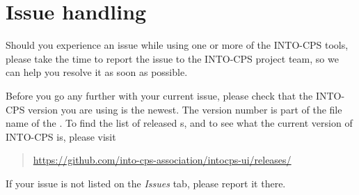 \section{Issue handling}\label{sec:issues}
Should you experience an issue while using one or more of the INTO-CPS tools,
please take the time to report the issue to the INTO-CPS project team, so we
can help you resolve it as soon as possible.

Before you go any further with your current issue, please check that the
INTO-CPS version you are using is the newest. The version number is part of the
file name of the \intoapp{}. To find the list of released
\intoapp s, and to see what the current version of INTO-CPS
is, please visit
%
\begin{quote}
\url{https://github.com/into-cps-association/intocps-ui/releases/}
\end{quote}
%
If your issue is not listed on the \emph{Issues} tab, please report it there.